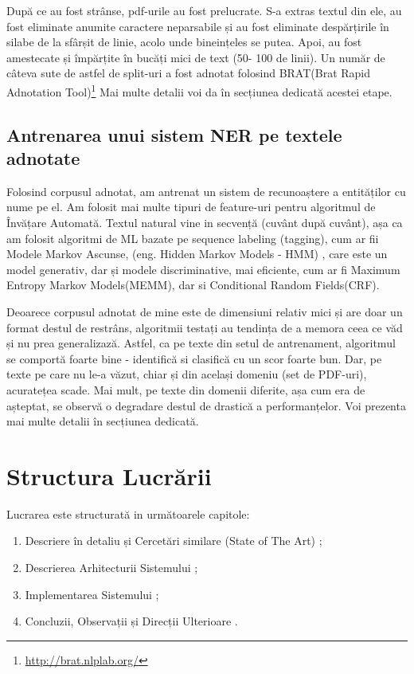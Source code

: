 După ce au fost strânse, pdf-urile au fost prelucrate. S-a extras textul din ele, au fost eliminate anumite caractere neparsabile și au fost eliminate despărțirile în silabe de la sfârșit de linie, acolo unde bineințeles se putea. Apoi, au fost amestecate și împărțite în bucăți mici de text (50- 100 de linii). Un număr de câteva sute de astfel de split-uri a fost adnotat folosind BRAT(Brat Rapid Adnotation Tool)\footnote{\url{http://brat.nlplab.org/}} Mai multe detalii voi da în secțiunea dedicată acestei etape.

\subsection{Antrenarea unui sistem NER pe textele adnotate}

Folosind corpusul adnotat, am antrenat un sistem de recunoaștere a entităților cu nume pe el. Am folosit mai multe tipuri de feature-uri pentru algoritmul de Învățare Automată. Textul natural vine in secvență (cuvânt după cuvânt), așa ca am folosit algoritmi de ML bazate pe sequence labeling (tagging), cum ar fii Modele Markov Ascunse, (eng. Hidden Markov Models - HMM) , care este un model generativ, dar și modele discriminative, mai eficiente, cum ar fi Maximum Entropy Markov Models(MEMM), dar si Conditional Random Fields(CRF).

Deoarece corpusul adnotat de mine este de dimensiuni relativ mici și are doar un format destul de restrâns, algoritmii testați au tendința de a memora ceea ce văd și nu prea generalizază. Astfel, ca pe texte din setul de antrenament, algoritmul se comportă foarte bine - identifică si clasifică cu un scor foarte bun. Dar, pe texte pe care nu le-a văzut, chiar și din același domeniu (set de PDF-uri), acuratețea scade. Mai mult, pe texte din domenii diferite, așa cum era de așteptat, se observă o degradare destul de drastică a performanțelor. Voi prezenta mai multe detalii în secțiunea dedicată.

\section{Structura Lucrării}

Lucrarea este structurată in următoarele capitole:

\begin{enumerate}

\item Descriere în detaliu și Cercetări similare (State of The Art)  ;
\item Descrierea Arhitecturii Sistemului ;
\item Implementarea Sistemului ;
\item Concluzii, Observații și Direcții Ulterioare .

\end{enumerate}
